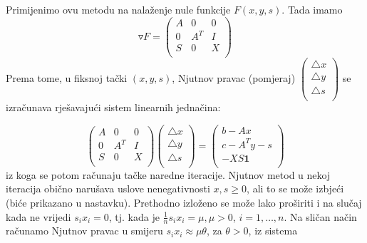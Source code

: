 \documentclass[a4paper, utf8, 11pt, colorlinks]{book}
\begin{document}
Primijenimo ovu metodu na nalaženje nule funkcije $F(x,y,s)$. Tada imamo
$$ \triangledown F =\left ( \begin{array}{ccc}
	A   & 0      &  0      \\
	0   & A^T    &  I      \\
	S   & 0      & X       \\
\end{array} \right ) 
$$
Prema tome, u fiksnoj tački $(x,y,s)$, Njutnov pravac (pomjeraj)
$
\begin{pmatrix}
	\bigtriangleup  x  \\
	\bigtriangleup  y  \\
	\bigtriangleup  s  \\
\end{pmatrix}
$
se izračunava rješavajući sistem linearnih jednačina:

\begin{equation}
	\begin{pmatrix}
		A   & 0      &  0      \\
		0   & A^T    &  I      \\
		S   & 0      & X       \\
	\end{pmatrix}  
	\begin{pmatrix} 
		\bigtriangleup  x  \\
		\bigtriangleup  y  \\
		\bigtriangleup  s  \\
	\end{pmatrix} 
	= 
	\begin{pmatrix} 
		b - Ax             \\
		c - A^T y - s      \\
		- X S \textbf{1}  \\                   
	\end{pmatrix} 
\end{equation}
iz koga se potom računaju tačke naredne  iteracije. 
Njutnov metod   u nekoj iteracija obično narušava uslove nenegativnosti $x,s \geq 0$, ali to se može izbjeći (biće prikazano u nastavku).  
Prethodno izloženo se može lako proširiti i na slučaj kada ne vrijedi $s_ix_i = 0$, tj. kada je $\frac{1}{n}s_ix_i = \mu, \mu > 0$, $i=1,\ldots,n$. Na sličan način računamo Njutnov pravac u smijeru $s_i x_i \approx \mu \theta$, za  $\theta >0$, iz sistema 
\end{document}
